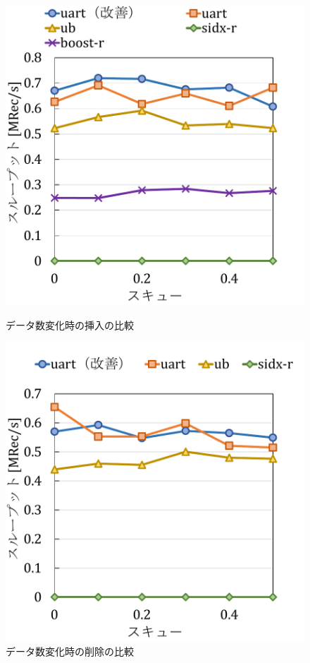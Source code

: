 \begin{figure}[tb]
  \begin{minipage}[c]{0.495\textwidth}
    \centering
    \includegraphics[scale=0.5]{./figures/graph-skew-update-2.pdf}
    \caption{データ数変化時の挿入の比較}
    \label{graph:grouped}
  \end{minipage}
  \begin{minipage}[c]{0.495\textwidth}
    \centering
    \includegraphics[scale=0.5]{./figures/graph-skew-update-8.pdf}
    \caption{データ数変化時の削除の比較}
    \label{graph:paired}
  \end{minipage}
\end{figure}



